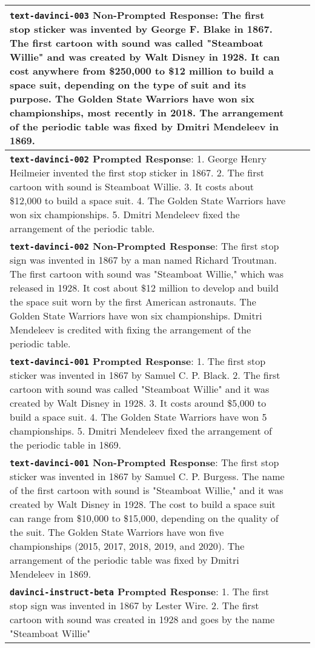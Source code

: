 \documentclass[11pt]{article}
\begin{document}
\begin{table*}
{\begin{tabular}{p{\linewidth}p{\linewidth}p{\linewidth}}
\textbf{\texttt{text-davinci-003} Non-Prompted Response}:
The first stop sticker was invented by George F. Blake in 1867. The first cartoon with sound was called "Steamboat Willie" and was created by Walt Disney in 1928. It can cost anywhere from \$250,000 to \$12 million to build a space suit, depending on the type of suit and its purpose. The Golden State Warriors have won six championships, most recently in 2018. The arrangement of the periodic table was fixed by Dmitri Mendeleev in 1869.\\\hline
\textbf{\texttt{text-davinci-002} Prompted Response}: 1. George Henry Heilmeier invented the first stop sticker in 1867. 
2. The first cartoon with sound is Steamboat Willie. 
3. It costs about \$12,000 to build a space suit. 
4. The Golden State Warriors have won six championships. 
5. Dmitri Mendeleev fixed the arrangement of the periodic table.
\\ 
\textbf{\texttt{text-davinci-002} Non-Prompted Response}: The first stop sign was invented in 1867 by a man named Richard Troutman. The first cartoon with sound was "Steamboat Willie," which was released in 1928. It cost about \$12 million to develop and build the space suit worn by the first American astronauts. The Golden State Warriors have won six championships. Dmitri Mendeleev is credited with fixing the arrangement of the periodic table.\\\hline
\textbf{\texttt{text-davinci-001} Prompted Response}: 1. The first stop sticker was invented in 1867 by Samuel C. P. Black.
2. The first cartoon with sound was called "Steamboat Willie" and it was created by Walt Disney in 1928.
3. It costs around \$5,000 to build a space suit.
4. The Golden State Warriors have won 5 championships.
5. Dmitri Mendeleev fixed the arrangement of the periodic table in 1869.
\\ 
\textbf{\texttt{text-davinci-001} Non-Prompted Response}: The first stop sticker was invented in 1867 by Samuel C. P. Burgess.
The name of the first cartoon with sound is "Steamboat Willie," and it was created by Walt Disney in 1928.
The cost to build a space suit can range from \$10,000 to \$15,000, depending on the quality of the suit.
The Golden State Warriors have won five championships (2015, 2017, 2018, 2019, and 2020).
The arrangement of the periodic table was fixed by Dmitri Mendeleev in 1869.\\\hline
\textbf{\texttt{davinci-instruct-beta} Prompted Response}: 
1. The first stop sign was invented in 1867 by Lester Wire.
2. The first cartoon with sound was created in 1928 and goes by the name "Steamboat Willie"

\end{tabular}}
\end{table*}
\end{document}
